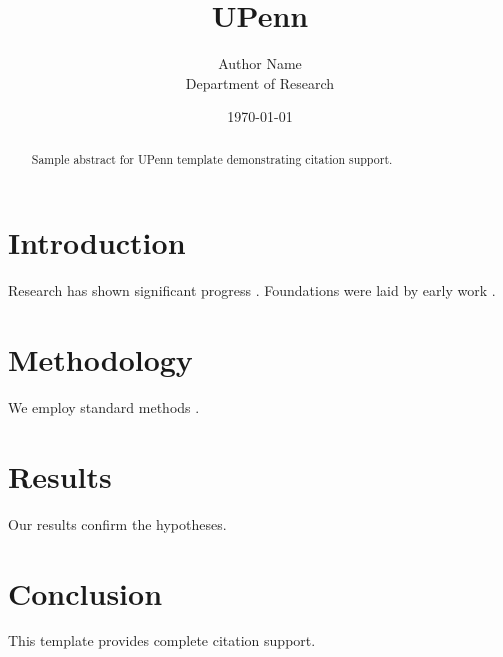 \documentclass{thesis_penn}
\title{UPenn}
\author{Author Name \\ \small Department of Research}
\date{\today}
\begin{document}
\maketitle

\begin{abstract}
Sample abstract for UPenn template demonstrating citation support.
\end{abstract}

\section{Introduction}
Research has shown significant progress \citep{einstein1905}. Foundations were laid by early work \citep{turing1950}.

\section{Methodology}
We employ standard methods \citep{knuth1984}.

\section{Results}
Our results confirm the hypotheses.

\section{Conclusion}
This template provides complete citation support.



\end{document}
